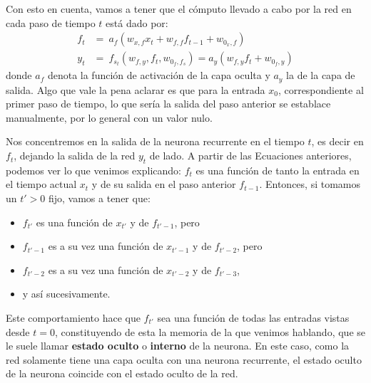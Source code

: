 \documentclass[../../main.tex]{subfiles}
\begin{document}
Con esto en cuenta, vamos a tener que el cómputo llevado a cabo por la red
en cada paso de tiempo \(t\) está dado por:
\begin{align}
    f_t &=\ a_f \left( w_{x,f} x_t  + w_{f,f} f_{t-1} + w_{0_x,f} \right) \label{eq:ft} \\
    y_t &=\ f_{s_t} \left( w_{f,y}, f_t, w_{0_f, f_s} \right) = a_y \left( w_{f,y} f_t + w_{0_f, y} \right) \label{eq:yt}
\end{align}
donde \(a_f\) denota la función de activación de la capa oculta y \(a_y\) la de la capa de
salida. Algo que vale la pena aclarar es que para la entrada \(x_0\), correspondiente al
primer paso de tiempo, lo que sería la salida del paso anterior se establace manualmente,
por lo general con un valor nulo.

Nos concentremos en la salida de la neurona recurrente en el tiempo \(t\), es decir
en \(f_t\), dejando la salida de la red \(y_t\) de lado. A partir de las Ecuaciones
anteriores, podemos ver lo que venimos explicando: \(f_t\) es una función de
tanto la entrada en el tiempo actual \(x_t\) y de su salida en el paso anterior
\(f_{t-1}\). Entonces, si tomamos un \(t' > 0\) fijo, vamos a tener que:
\begin{itemize}[itemsep=0.05cm]
    \item \(f_{t'}\) es una función de \(x_{t'}\) y de \(f_{t'-1}\), pero
    \item \(f_{t'-1}\) es a su vez una función de \(x_{t'-1}\) y de \(f_{t'-2}\), pero
    \item \(f_{t'-2}\) es a su vez una función de \(x_{t'-2}\) y de \(f_{t'-3}\),
    \item y así sucesivamente.
\end{itemize}
Este comportamiento hace que \(f_{t'}\) sea una función de todas las entradas vistas desde
\(t=0\), constituyendo de esta la memoria de la que venimos hablando, que se le suele
llamar \textbf{estado oculto} o \textbf{interno} de la neurona. En este caso, como la red
solamente tiene una capa oculta con una neurona recurrente, el estado oculto de la neurona
coincide con el estado oculto de la red.
\end{document}
